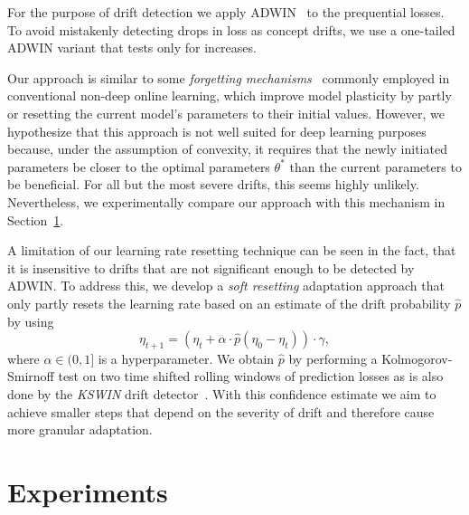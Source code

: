 \documentclass[letterpaper]{article} %
\begin{document}
For the purpose of drift detection we apply ADWIN~\cite{bifetLearningTimeChangingData2007} to the prequential losses.
To avoid mistakenly detecting drops in loss as concept drifts, we use a one-tailed ADWIN variant that tests only for increases.

Our approach is similar to some \textit{forgetting mechanisms}~\cite{gamaSurveyConceptDrift2014} commonly employed in conventional non-deep online learning, which improve model plasticity by partly~\cite{bifetAdaptiveLearningEvolving2009} or resetting the current model's parameters to their initial values.
However, we hypothesize that this approach is not well suited for deep learning purposes because, under the assumption of convexity, it requires that the newly initiated parameters be closer to the optimal parameters $\theta^*$ than the current parameters to be beneficial.
For all but the most severe drifts, this seems highly unlikely.
Nevertheless, we experimentally compare our approach with this mechanism in Section~\ref{sec:experiments}.

A limitation of our learning rate resetting technique can be seen in the fact, that it is insensitive to drifts that are not significant enough to be detected by ADWIN.
To address this, we develop a \textit{soft resetting} adaptation approach that only partly resets the learning rate based on an estimate of the drift probability $\hat{p}$ by using
\begin{equation}
	\eta_{t+1} = (\eta_t + \alpha\cdot \hat{p}(\eta_0 - \eta_t)) \cdot \gamma,
\end{equation}\label{eq:soft_drift_reset}
where $\alpha \in (0, 1]$ is a hyperparameter.
We obtain $\hat{p}$ by performing a Kolmogorov-Smirnoff test on two time shifted rolling windows of prediction losses as is also done by the \textit{KSWIN} drift detector~\cite{raabReactiveSoftPrototype2020a}.
With this confidence estimate we aim to achieve smaller steps that depend on the severity of drift and therefore cause more granular adaptation.




\section{Experiments}\label{sec:experiments}
\end{document}
